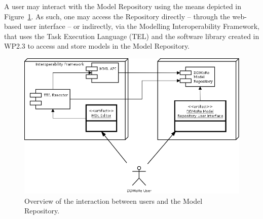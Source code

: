 A \ddmore user may interact with the Model Repository using the means depicted in Figure~\ref{fig:userInteraction}. As such, one may access the Repository directly -- through the web-based user interface -- or indirectly, via the Modelling Interoperability Framework, that uses the Task Execution Language (TEL) and the software library created in WP2.3 to access and store models in the \ddmore Model Repository. 

\begin{figure}[htb]
\centering
\includegraphics[width=0.75\linewidth]{img/UserInteraction}
\caption{Overview of the interaction between \ddmore users and the Model Repository.}
\label{fig:userInteraction}
\end{figure}

